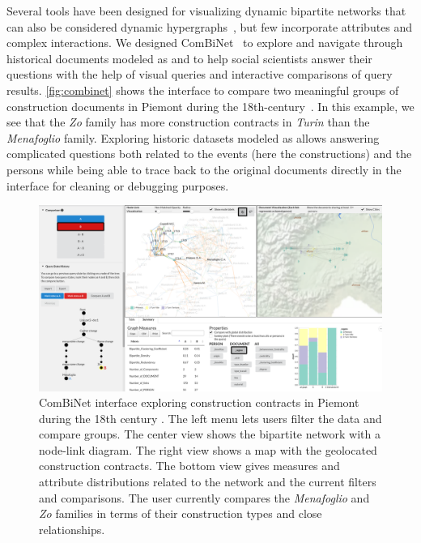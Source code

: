 Several tools have been designed for visualizing dynamic bipartite networks that can also be considered dynamic hypergraphs~\cite{valdivia_analyzing_2021, penaarayaHyperStorylinesInteractivelyUntangling2022}, but few incorporate attributes and complex interactions.
We designed ComBiNet~\cite{pister2022visual} to explore and navigate through historical documents modeled as \modelplural and to help social scientists answer their questions with the help of visual queries and interactive comparisons of query results. \autoref{fig:combinet} shows the interface to compare two meaningful groups of construction documents in Piemont during the 18th-century~\cite{Cristofoli2018}. In this example, we see that the \textit{Zo} family has more construction contracts in \textit{Turin} than the \textit{Menafoglio} family.
Exploring historic datasets modeled as \modelplural allows answering complicated questions both related to the events (here the constructions) and the persons while being able to trace back to the original documents directly in the interface for cleaning or debugging purposes.

\begin{figure}[tb]
    \centering %
    \includegraphics[width=\columnwidth]{static/figures/HSNAProcess/OriginalPaperFigures/ComBiNet.png}
    \caption{ComBiNet interface exploring construction contracts in Piemont during the 18th century \cite{Cristofoli2018}. The left menu lets users filter the data and compare groups. The center view shows the bipartite network with a node-link diagram. The right view shows a map with the geolocated construction contracts. The bottom view gives measures and attribute distributions related to the network and the current filters and comparisons.
    The user currently compares the \textit{Menafoglio} and \textit{Zo} families in terms of their construction types and close relationships.}
    \label{fig:combinet}
\end{figure}


